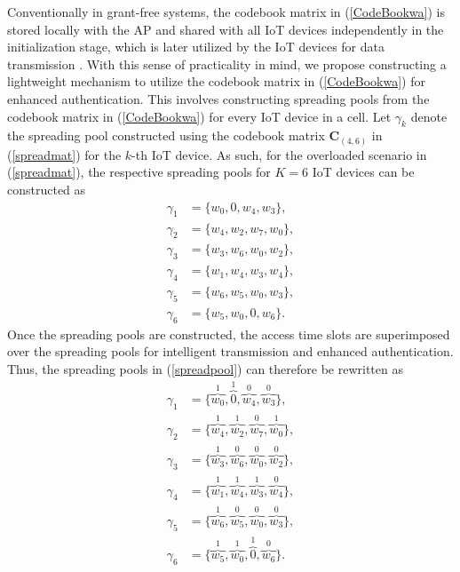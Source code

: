 \documentclass[journal,10pt]{IEEEtran}
\begin{document}
Conventionally in grant-free systems, the codebook matrix in (\ref{CodeBookwa}) is stored locally with the AP and shared with all IoT devices independently in the initialization stage, which is later utilized by the IoT devices for data transmission \cite{liu2018sparse, shahab2020grant}. With this sense of practicality in mind, we propose constructing a lightweight mechanism to utilize the codebook matrix in (\ref{CodeBookwa}) for enhanced authentication. This involves constructing spreading pools from the codebook matrix in (\ref{CodeBookwa}) for every IoT device in a cell. Let $\gamma_k$ denote the spreading pool constructed using the codebook matrix $\mathbf{C}_{(4,6)}$ in (\ref{spreadmat}) for the $k$-th IoT device. As such, for the overloaded scenario in (\ref{spreadmat}), the respective spreading pools for $K = 6$  IoT devices can be constructed as
\begin{equation} \label{spreadpool}
    \begin{split}
        \gamma_1 &= \{ w_0, 0, w_4, w_3   \},  \\
        \gamma_2 &= \{ w_4, w_2, w_7, w_0    \},  \\
        \gamma_3 &= \{ w_3, w_6, w_0, w_2    \}, \\ 
        \gamma_4 &= \{ w_1,  w_4,  w_3, w_4    \}, \\
        \gamma_5 &= \{ w_6, w_5, w_0, w_3    \}, \\ 
        \gamma_6 &= \{ w_5,  w_0,  0, w_6    \}.  
    \end{split}
\end{equation}
Once the spreading pools are constructed, the access time slots  are superimposed over the spreading pools for intelligent transmission and enhanced authentication. Thus, the spreading pools in (\ref{spreadpool}) can therefore be rewritten as
\begin{equation} \label{spreadpool_PRBS}
    \begin{split}
        \gamma_1 &= \{ \overbrace{w_0}^1, \overbrace{0}^1, \overbrace{w_4}^0, \overbrace{w_3}^0   \},  \\
        \gamma_2 &= \{ \overbrace{w_4}^1, \overbrace{w_2}^1, \overbrace{w_7}^0, \overbrace{w_0}^1    \},  \\
        \gamma_3 &= \{ \overbrace{w_3}^1, \overbrace{w_6}^0, \overbrace{w_0}^0, \overbrace{w_2}^0    \}, \\ 
        \gamma_4 &= \{ \overbrace{w_1}^1,  \overbrace{w_4}^1,  \overbrace{w_3}^1, \overbrace{w_4}^0    \}, \\
        \gamma_5 &= \{ \overbrace{w_6}^1, \overbrace{w_5}^0, \overbrace{w_0}^0, \overbrace{w_3}^0    \}, \\ 
        \gamma_6 &= \{ \overbrace{w_5}^1,  \overbrace{w_0}^1,  \overbrace{0}^1, \overbrace{w_6}^0    \}.  
    \end{split}
\end{equation}
\end{document}
